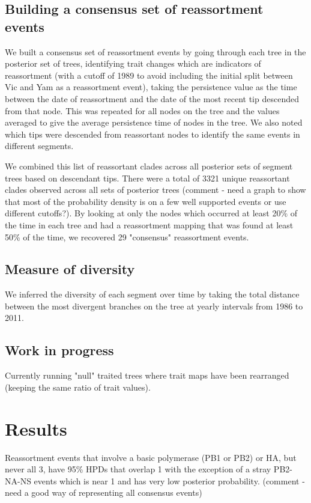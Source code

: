 \documentclass[11pt,oneside,letterpaper]{article}
\begin{document}
\subsection*{Building a consensus set of reassortment events}
We built a consensus set of reassortment events by going through each tree in the posterior set of trees, identifying trait changes which are indicators of reassortment (with a cutoff of 1989 to avoid including the initial split between Vic and Yam as a reassortment event), taking the persistence value as the time between the date of reassortment and the date of the most recent tip descended from that node. 
This was repeated for all nodes on the tree and the values averaged to give the average persistence time of nodes in the tree. 
We also noted which tips were descended from reassortant nodes to identify the same events in different segments.

We combined this list of reassortant clades across all posterior sets of segment trees based on descendant tips. 
There were a total of 3321 unique reassortant clades observed across all sets of posterior trees (comment - need a graph to show that most of the probability density is on a few well supported events or use different cutoffs?). 
By looking at only the nodes which occurred at least 20\% of the time in each tree and had a reassortment mapping that was found at least 50\% of the time, we recovered 29 "consensus" reassortment events.

\subsection*{Measure of diversity}
We inferred the diversity of each segment over time by taking the total distance between the most divergent branches on the tree at yearly intervals from 1986 to 2011. 

\subsection*{Work in progress}
Currently running "null" traited trees where trait maps have been rearranged (keeping the same ratio of trait values).

\section*{Results}
Reassortment events that involve a basic polymerase (PB1 or PB2) or HA, but never all 3, have 95\% HPDs that overlap 1 with the exception of a stray PB2-NA-NS events which is near 1 and has very low posterior probability. (comment - need a good way of representing all consensus events)
\end{document}
